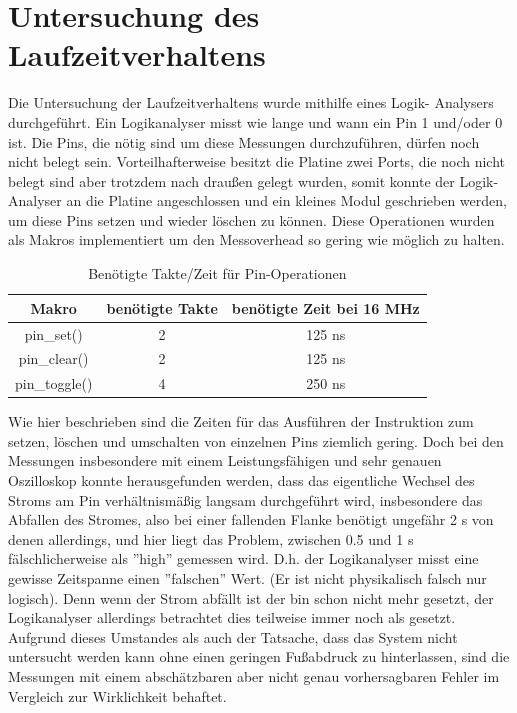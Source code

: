 \chapter{Untersuchung des Laufzeitverhaltens}
Die Untersuchung der Laufzeitverhaltens wurde mithilfe eines Logik-
Analysers durchgeführt. Ein Logikanalyser misst wie lange und wann
ein Pin 1 und/oder 0 ist. Die Pins, die nötig sind um diese Messungen
durchzuführen, dürfen noch nicht belegt sein. Vorteilhafterweise
besitzt die Platine zwei Ports, die noch nicht belegt sind aber
trotzdem nach draußen gelegt wurden, somit konnte der Logik-
Analyser an die Platine angeschlossen und ein kleines Modul
geschrieben werden, um diese Pins setzen und wieder löschen zu
können. Diese Operationen wurden als Makros implementiert um den
Messoverhead so gering wie möglich zu halten.
\begin{table}[htb]
\begin{center}
	\begin{tabular}{|c||c|c|}
		\hline
		\textbf{Makro} & \textbf{benötigte Takte} & \textbf{benötigte Zeit bei 16 MHz} \\ \hline \hline
		pin\_set() & 2 & 125 ns \\ \hline
		pin\_clear() & 2 & 125 ns \\ \hline
		pin\_toggle() & 4 & 250 ns \\ \hline
	\end{tabular}
	\caption{\label{pin_takte} Benötigte Takte/Zeit für Pin-Operationen}
\end{center}
\end{table}
Wie hier beschrieben sind die Zeiten für das Ausführen der Instruktion
zum setzen, löschen und umschalten von einzelnen Pins ziemlich gering.
Doch bei den Messungen insbesondere mit einem Leistungsfähigen und
sehr genauen Oszilloskop konnte herausgefunden werden, dass das eigentliche
Wechsel des Stroms am Pin verhältnismäßig langsam durchgeführt wird,
insbesondere das Abfallen des Stromes, also bei einer fallenden Flanke
benötigt ungefähr 2 \textmu{}s von denen allerdings, und hier liegt das Problem,
zwischen 0.5 und 1 \textmu{}s fälschlicherweise als ''high'' gemessen wird.
D.h. der Logikanalyser misst eine gewisse Zeitspanne einen ''falschen'' Wert.
(Er ist nicht physikalisch falsch nur logisch). Denn wenn der Strom abfällt
ist der bin schon nicht mehr gesetzt, der Logikanalyser allerdings betrachtet
dies teilweise immer noch als gesetzt.
Aufgrund dieses Umstandes als auch der Tatsache, dass das System nicht untersucht
werden kann ohne einen geringen Fußabdruck zu hinterlassen, sind die Messungen mit
einem abschätzbaren aber nicht genau vorhersagbaren Fehler im Vergleich zur
Wirklichkeit behaftet.
